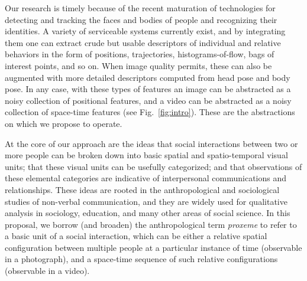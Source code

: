 Our research is timely because of the recent maturation of technologies for detecting and tracking the faces and bodies of people and recognizing their identities. A variety of serviceable systems currently exist, and by integrating them one can extract crude but usable descriptors of individual and relative behaviors in the form of positions, trajectories, histograms-of-flow, bags of interest points, and so on. When image quality permits, these can also be augmented with more detailed descriptors computed from head pose and body pose. In any case, with these types of features an image can be abstracted as a noisy collection of positional features, and a video can be abstracted as a noisy collection of space-time features (see Fig.~\ref{fig:intro}). These are the abstractions on which we propose to operate.

At the core of our approach are the ideas that social interactions between two or more people can be broken down into basic spatial and spatio-temporal visual units; that these visual units can be usefully categorized; and that observations of these elemental categories are indicative of interpersonal communications and relationships. These ideas are rooted in the anthropological and sociological studies of non-verbal communication, and they are widely used for qualitative analysis in sociology, education, and many other areas of social science. In this proposal, we borrow (and broaden) the anthropological term \emph{proxeme} to refer to a basic unit of a social interaction, which can be either a relative spatial configuration between multiple people at a particular instance of time (observable in a photograph), and a space-time sequence of such relative configurations (observable in a video).



